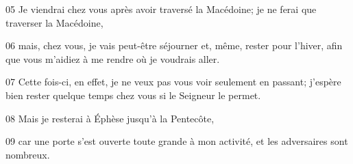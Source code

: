 
05 Je viendrai chez vous après avoir traversé la Macédoine; je ne ferai que traverser la Macédoine,

06 mais, chez vous, je vais peut-être séjourner et, même, rester pour l’hiver, afin que vous m’aidiez à me rendre où je voudrais aller.

07 Cette fois-ci, en effet, je ne veux pas vous voir seulement en passant; j’espère bien rester quelque temps chez vous si le Seigneur le permet.

08 Mais je resterai à Éphèse jusqu’à la Pentecôte,

09 car une porte s’est ouverte toute grande à mon activité, et les adversaires sont nombreux.
